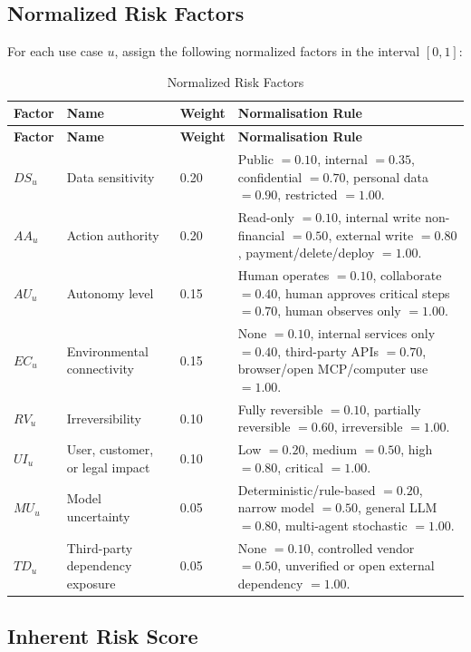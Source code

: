 \documentclass[11pt,a4paper]{article}
\begin{document}
\subsection{Normalized Risk Factors}

For each use case \(u\), assign the following normalized factors in the interval \([0, 1]\):

\begin{longtable}{P{0.10\textwidth}P{0.19\textwidth}P{0.12\textwidth}P{0.46\textwidth}}
\caption{Normalized Risk Factors} \\
\toprule
\textbf{Factor} & \textbf{Name} & \textbf{Weight} & \textbf{Normalisation Rule} \\
\midrule
\endfirsthead
\toprule
\textbf{Factor} & \textbf{Name} & \textbf{Weight} & \textbf{Normalisation Rule} \\
\midrule
\endhead
\(DS_u\) & Data sensitivity & 0.20 & Public \(=0.10\), internal \(=0.35\), confidential \(=0.70\), personal data \(=0.90\), restricted \(=1.00\). \\
\(AA_u\) & Action authority & 0.20 & Read-only \(=0.10\), internal write non-financial \(=0.50\), external write \(=0.80\), payment/delete/deploy \(=1.00\). \\
\(AU_u\) & Autonomy level & 0.15 & Human operates \(=0.10\), collaborate \(=0.40\), human approves critical steps \(=0.70\), human observes only \(=1.00\). \\
\(EC_u\) & Environmental connectivity & 0.15 & None \(=0.10\), internal services only \(=0.40\), third-party APIs \(=0.70\), browser/open MCP/computer use \(=1.00\). \\
\(RV_u\) & Irreversibility & 0.10 & Fully reversible \(=0.10\), partially reversible \(=0.60\), irreversible \(=1.00\). \\
\(UI_u\) & User, customer, or legal impact & 0.10 & Low \(=0.20\), medium \(=0.50\), high \(=0.80\), critical \(=1.00\). \\
\(MU_u\) & Model uncertainty & 0.05 & Deterministic/rule-based \(=0.20\), narrow model \(=0.50\), general LLM \(=0.80\), multi-agent stochastic \(=1.00\). \\
\(TD_u\) & Third-party dependency exposure & 0.05 & None \(=0.10\), controlled vendor \(=0.50\), unverified or open external dependency \(=1.00\). \\
\bottomrule
\end{longtable}

\subsection{Inherent Risk Score}
\end{document}
